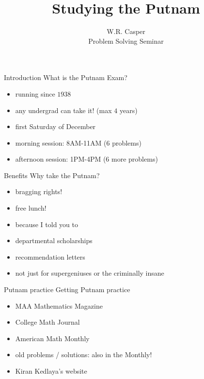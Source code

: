 \documentclass{beamer}
\title{Studying the Putnam}
\author[W.R. Casper] %
{W.R. Casper\\\vspace{0.2in}
 {\tiny Problem Solving Seminar}}
\institute[California State University Fullerton] %
{
  Department of Mathematics\\
  California State University Fullerton}
\begin{document}
\begin{frame}
  \titlepage
\end{frame}




\begin{frame}{Introduction}
What is the Putnam Exam?
\pause
\begin{itemize}
\pause
\item running since $1938$
\pause
\item any undergrad can take it! (max $4$ years)
\pause
\item first Saturday of December
\pause
\item morning session: 8AM-11AM (6 problems)
\pause
\item afternoon session: 1PM-4PM (6 more problems)
\end{itemize}
\end{frame}

\begin{frame}{Benefits}
Why take the Putnam?
\begin{itemize}
\pause
\item bragging rights!
\pause
\item free lunch!
\pause
\item because I told you to
\pause
\item departmental scholarships
\pause
\item recommendation letters
\pause
\item not just for supergeniuses or the criminally insane
\end{itemize}
\end{frame}

\begin{frame}{Putnam practice}
Getting Putnam practice
\pause
\begin{itemize}
\pause
\item MAA Mathematics Magazine
\pause
\item College Math Journal
\pause
\item American Math Monthly
\pause
\item old problems / solutions: also in the Monthly!
\pause
\item Kiran Kedlaya's website
\end{itemize}
\end{frame}
\end{document}
